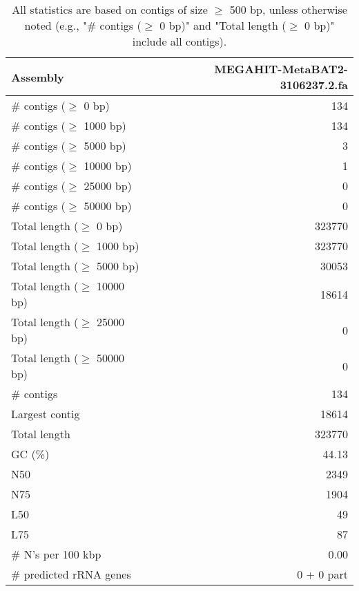\documentclass[12pt,a4paper]{article}
\begin{document}
\begin{table}[ht]
\begin{center}
\caption{All statistics are based on contigs of size $\geq$ 500 bp, unless otherwise noted (e.g., "\# contigs ($\geq$ 0 bp)" and "Total length ($\geq$ 0 bp)" include all contigs).}
\begin{tabular}{|l*{1}{|r}|}
\hline
Assembly & MEGAHIT-MetaBAT2-3106237.2.fa \\ \hline
\# contigs ($\geq$ 0 bp) & 134 \\ \hline
\# contigs ($\geq$ 1000 bp) & 134 \\ \hline
\# contigs ($\geq$ 5000 bp) & 3 \\ \hline
\# contigs ($\geq$ 10000 bp) & 1 \\ \hline
\# contigs ($\geq$ 25000 bp) & 0 \\ \hline
\# contigs ($\geq$ 50000 bp) & 0 \\ \hline
Total length ($\geq$ 0 bp) & 323770 \\ \hline
Total length ($\geq$ 1000 bp) & 323770 \\ \hline
Total length ($\geq$ 5000 bp) & 30053 \\ \hline
Total length ($\geq$ 10000 bp) & 18614 \\ \hline
Total length ($\geq$ 25000 bp) & 0 \\ \hline
Total length ($\geq$ 50000 bp) & 0 \\ \hline
\# contigs & 134 \\ \hline
Largest contig & 18614 \\ \hline
Total length & 323770 \\ \hline
GC (\%) & 44.13 \\ \hline
N50 & 2349 \\ \hline
N75 & 1904 \\ \hline
L50 & 49 \\ \hline
L75 & 87 \\ \hline
\# N's per 100 kbp & 0.00 \\ \hline
\# predicted rRNA genes & 0 + 0 part \\ \hline
\end{tabular}
\end{center}
\end{table}
\end{document}
